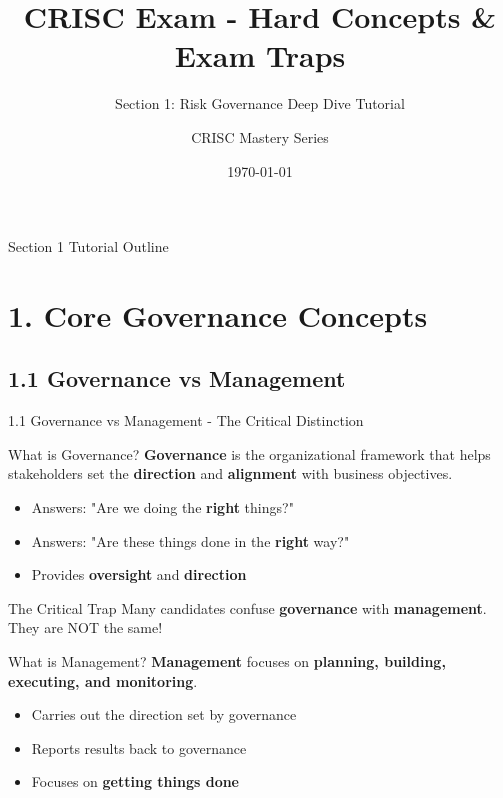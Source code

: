 \documentclass[10pt]{beamer}  %
\title{CRISC Exam - Hard Concepts \& Exam Traps}
\subtitle{Section 1: Risk Governance Deep Dive Tutorial}
\author{CRISC Mastery Series}
\date{\today}
\begin{document}
	
	\begin{frame}
		\titlepage
	\end{frame}
	
	\begin{frame}{Section 1 Tutorial Outline}\   
		 \tiny
		\tableofcontents
	\end{frame}
	
	\section{1. Core Governance Concepts}
	
	\subsection{1.1 Governance vs Management}
	\begin{frame}{1.1 Governance vs Management - The Critical Distinction}
		\begin{block}{What is Governance?}
			\textbf{Governance} is the organizational framework that helps stakeholders set the \textbf{direction} and \textbf{alignment} with business objectives.
			\begin{itemize}
				\item Answers: "Are we doing the \textbf{right} things?"
				\item Answers: "Are these things done in the \textbf{right} way?"
				\item Provides \textbf{oversight} and \textbf{direction}
			\end{itemize}
		\end{block}
		
		\begin{alertblock}{The Critical Trap}
			Many candidates confuse \textbf{governance} with \textbf{management}. They are NOT the same!
		\end{alertblock}
		
		\begin{block}{What is Management?}
			\textbf{Management} focuses on \textbf{planning, building, executing, and monitoring}.
			\begin{itemize}
				\item Carries out the direction set by governance
				\item Reports results back to governance
				\item Focuses on \textbf{getting things done}
			\end{itemize}
		\end{block}
	\end{frame}
	
\end{document}
